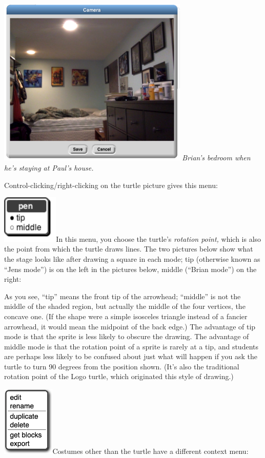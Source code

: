 \includegraphics[width=3.56944in,height=3.18056in]{media/image1085.png}
\emph{Brian's bedroom when he's staying at Paul's house.}

Control-clicking/right-clicking on the turtle picture gives this menu:

\includegraphics[width=1.05556in,height=0.90278in]{media/image1086.png}In
this menu, you choose the turtle's \emph{rotation point,} which is also
the point from which the turtle draws lines. The two pictures below show
what the stage looks like after drawing a square in each mode; tip
(otherwise known as ``Jens mode'') is on the left in the pictures below,
middle (``Brian mode'') on the right:

As you see, ``tip'' means the front tip of the arrowhead; ``middle'' is
not the middle of the shaded region, but actually the middle of the four
vertices, the concave one. (If the shape were a simple isosceles
triangle instead of a fancier arrowhead, it would mean the midpoint of
the back edge.) The advantage of tip mode is that the sprite is less
likely to obscure the drawing. The advantage of middle mode is that the
rotation point of a sprite is rarely at a tip, and students are perhaps
less likely to be confused about just what will happen if you ask the
turtle to turn 90 degrees from the position shown. (It's also the
traditional rotation point of the Logo turtle, which originated this
style of drawing.)

\includegraphics[width=0.98333in,height=1.31944in]{media/image1091.png}Costumes
other than the turtle have a different context menu:

